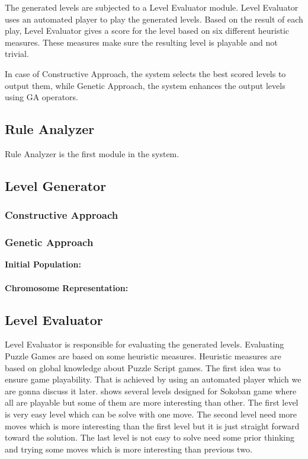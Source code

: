 The generated levels are subjected to a Level Evaluator module. Level Evaluator uses an automated player to play the generated levels. Based on the result of each play, Level Evaluator gives a score for the level based on six different heuristic measures. These measures make sure the resulting level is playable and not trivial.\\\par

In case of Constructive Approach, the system selects the best scored levels to output them, while Genetic Approach, the system enhances the output levels using GA operators.

\subsection{Rule Analyzer}
Rule Analyzer is the first module in the system. 

\subsection{Level Generator}
\subsubsection{Constructive Approach}
\subsubsection{Genetic Approach}
\textbf{Initial Population:}\\\\
\textbf{Chromosome Representation:}
\subsection{Level Evaluator}
Level Evaluator is responsible for evaluating the generated levels. Evaluating Puzzle Games are based on some heuristic measures. Heuristic measures are based on global knowledge about Puzzle Script games. The first idea was to ensure game playability. That is achieved by using an automated player which we are gonna discuss it later.  shows several levels designed for Sokoban game where all are playable but some of them are more interesting than other. The first level is very easy level which can be solve with one move. The second level need more moves which is more interesting than the first level but it is just straight forward toward the solution. The last level is not easy to solve need some prior thinking and trying some moves which is more interesting than previous two.

